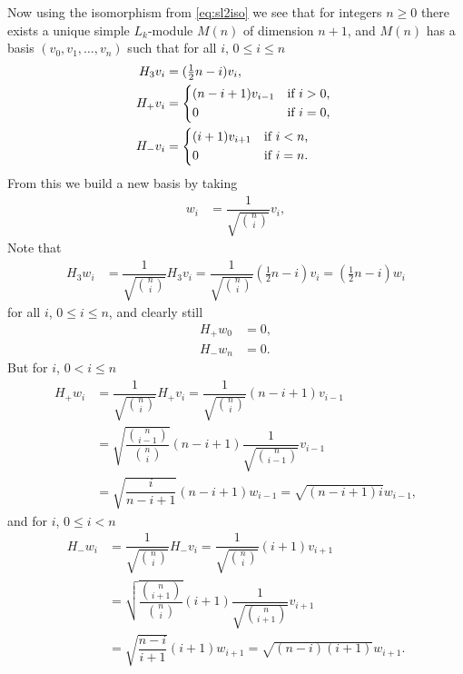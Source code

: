 Now using the isomorphism from \cref{eq:sl2iso} we see that for integers $n\geq 0$ there exists a unique simple $L_k$-module $M(n)$ of dimension $n+1$, and $M(n)$ has a basis $(v_0,v_1,\dotsc,v_n)$ such that for all $i$, $0\leq i\leq n$
\begin{align}\label{eq:L_kbasis1}
  \begin{aligned}
    H_3v_i &= (\tfrac{1}{2}n-i)v_i, \\
    H_+v_i &=
    \begin{dcases*}
      (n-i+1)v_{i-1} & if $i>0$, \\
      0 & if $i=0$,
    \end{dcases*} \\
    H_-v_i &=
    \begin{dcases*}
      (i+1)v_{i+1} & if $i<n$, \\
      0 & if $i=n$.
    \end{dcases*}
  \end{aligned}
\end{align}
From this we build a new basis by taking
\begin{align*}
  w_i &= \dfrac{1}{\sqrt{\binom{n}{i}}}v_i,
\end{align*}
Note that
\begin{align*}
  H_3w_i &= \dfrac{1}{\sqrt{\binom{n}{i}}}H_3v_i = \dfrac{1}{\sqrt{\binom{n}{i}}}(\tfrac{1}{2}n-i)v_i = (\tfrac{1}{2}n-i)w_i
\end{align*}
for all $i$, $0\leq i\leq n$, and clearly still
\begin{align*}
  H_+w_0 &= 0, \\
  H_-w_n &= 0.
\end{align*}
But for $i$, $0<i\leq n$
\begin{align*}
  H_+w_i &= \dfrac{1}{\sqrt{\binom{n}{i}}}H_+v_i = \dfrac{1}{\sqrt{\binom{n}{i}}}(n-i+1)v_{i-1} \\
         &= \sqrt{\dfrac{\binom{n}{i-1}}{\binom{n}{i}}}(n-i+1)\dfrac{1}{\sqrt{\binom{n}{i-1}}}v_{i-1} \\  
  &= \sqrt{\dfrac{i}{n-i+1}}(n-i+1)w_{i-1} = \sqrt{(n-i+1)i}w_{i-1},
\end{align*}
and for $i$, $0\leq i<n$
\begin{align*}
  H_-w_i &= \dfrac{1}{\sqrt{\binom{n}{i}}}H_-v_i = \dfrac{1}{\sqrt{\binom{n}{i}}}(i+1)v_{i+1} \\
         &= \sqrt{\dfrac{\binom{n}{i+1}}{\binom{n}{i}}}(i+1)\dfrac{1}{\sqrt{\binom{n}{i+1}}}v_{i+1} \\
  &= \sqrt{\dfrac{n-i}{i+1}}(i+1)w_{i+1} = \sqrt{(n-i)(i+1)}w_{i+1}.
\end{align*}

